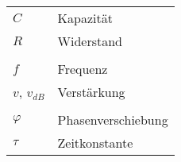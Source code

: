 \begin{table}[h]
    \begin{tabular}{@{}ll@{}}%
    	\(C\) & Kapazität\\
        \(R\) & Widerstand\\
        \(\) & \\
        \(f\) & Frequenz\\
        \(v\), \(v_{dB}\) & Verstärkung\\
        \(\) & \\
        \(\varphi\) & Phasenverschiebung\\
		\(\tau\) & Zeitkonstante\\
\end{tabular}
    \label{tab:glossar}
\end{table}